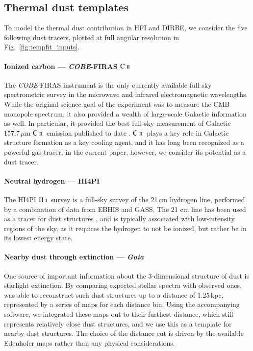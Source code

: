 \documentclass{aa}
\newcommand{\mathsc}[1]{{\normalfont\textsc{#1}}}
\def\COBE{\textit{COBE}}
\def\Gaia{\textit{Gaia}}
\newcommand{\CII}{\ensuremath{\mathsc{C\ ii}}}
\newcommand{\HI}{\ensuremath{\mathsc{H\ i}}}
\begin{document}
\subsection{Thermal dust templates}

To model the thermal dust contribution in HFI and DIRBE, we consider
the five following dust tracers, plotted at full angular resolution in Fig.~\ref{fig:tempfit_inputs}.

\paragraph{Ionized carbon --- \COBE-FIRAS \CII}
The \COBE-FIRAS instrument \citep{mather:1994} is the only currently
available full-sky spectrometric survey in the microwave and infrared
electromagnetic wavelengths. While the original science goal of the
experiment was to measure the CMB monopole spectrum, it also provided
a wealth of large-scale Galactic information as well. In particular,
it provided the best full-sky measurement of Galactic
$157.7\,\mu\mathrm m$ \CII\ emission published to date
\citep{fixsen:1998}. \CII\ plays a key role in Galactic structure
formation as a key cooling agent, and it has long been
recognized as a powerful gas tracer; in the current paper, however, we
consider its potential as a dust tracer. 

\paragraph{Neutral hydrogen --- HI4PI}
The HI4PI \HI\ survey \citep{HI4PI:2016} is a full-sky survey of the
21\,cm hydrogen line, performed by a combination of data from EBHIS
and GASS. The 21 cm line has been used as a tracer for dust structures
\citep{planck2011-7.12}, and is typically associated with
low-intensity regions of the sky, as it requires the hydrogen to not
be ionized, but rather be in its lowest energy state.

\paragraph{Nearby dust through extinction --- \Gaia}
One source of important information about the 3-dimensional structure
of dust is starlight extinction. By comparing expected stellar spectra
with observed ones, \cite{edenhofer:2024} was able to reconstruct such
dust structures up to a distance of 1.25\,kpc, represented by a series
of maps for each distance bin. Using the accompanying software, we
integrated these maps out to their furthest distance, which still
represents relatively close dust structures, and we use this as a
template for nearby dust structures. The choice of the distance cut is
driven by the available Edenhofer maps rather than any physical
considerations.
\end{document}
